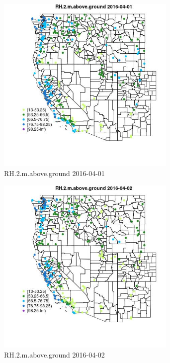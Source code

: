 \begin{figure} 
\centering  
\includegraphics[width=0.77\textwidth]{Code_Outputs/Report_ML_input_PM25_Step4_part_e_de_duplicated_aveswNAs_MapObsRH2maboveground2016-04-01.jpg} 
\caption{\label{fig:Report_ML_input_PM25_Step4_part_e_de_duplicated_aveswNAsMapObsRH2maboveground2016-04-01}RH.2.m.above.ground 2016-04-01} 
\end{figure} 
 

\begin{figure} 
\centering  
\includegraphics[width=0.77\textwidth]{Code_Outputs/Report_ML_input_PM25_Step4_part_e_de_duplicated_aveswNAs_MapObsRH2maboveground2016-04-02.jpg} 
\caption{\label{fig:Report_ML_input_PM25_Step4_part_e_de_duplicated_aveswNAsMapObsRH2maboveground2016-04-02}RH.2.m.above.ground 2016-04-02} 
\end{figure} 
 

